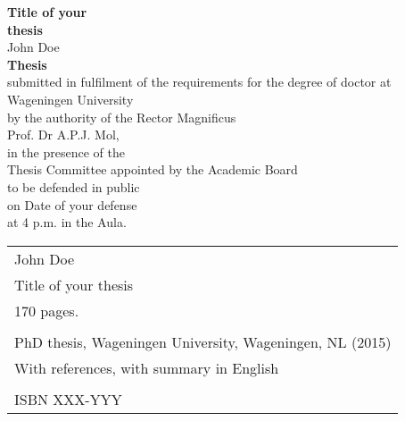 \newpage
\thispagestyle{empty}
\begin{center}
\Huge{\textbf{Title of your}} \\
\Huge{\textbf{thesis}} \\
\vspace*{1cm}
\Large{John Doe}\\
\normalsize
\vspace*{\fill}
\textbf{Thesis} \\
submitted in fulfilment of the requirements for the degree of doctor at \\
Wageningen University\\
by the authority of the Rector Magnificus\\
Prof. Dr A.P.J. Mol,\\
in the presence of the\\
Thesis Committee appointed by the Academic Board\\
to be defended in public\\
on Date of your defense\\
at 4 p.m. in the Aula.\\
\end{center}

\newpage
\thispagestyle{empty}
\vspace*{\fill}
\begin{flushleft}
\begin{tabular}{@{}p{\textwidth}}
    John Doe                                                 \\  
    Title of your thesis                                     \\  
    170 pages.                                               \\  
                                                             \\  
    PhD thesis, Wageningen University, Wageningen, NL (2015) \\  
    With references, with summary in English                 \\  
                                                             \\  
    ISBN XXX-YYY                                             \\  
\end{tabular}
\end{flushleft}
